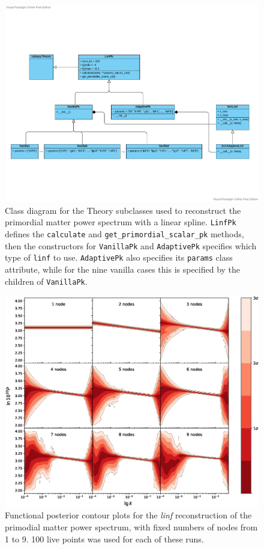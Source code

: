 \documentclass{article}
\begin{document}
\begin{figure}
  \centering
  \includegraphics[width=16cm]{Pk_linf.pdf}
  \caption{Class diagram for the Theory subclasses used to reconstruct the primordial matter power spectrum with a linear spline. \texttt{LinfPk} defines the \texttt{calculate} and \texttt{get\_primordial\_scalar\_pk} methods, then the constructors for \texttt{VanillaPk} and \texttt{AdaptivePk} specifies which type of \texttt{linf} to use. \texttt{AdaptivePk} also specifies its \texttt{params} class attribute, while for the nine vanilla cases this is specified by the children of \texttt{VanillaPk}.}
  \label{fig:PkUMLDiagram}
\end{figure}

\newpage

\begin{figure}[H]
  \centering
  \includegraphics[width=16cm]{vanilla100.eps}
  \caption{Functional posterior contour plots for the \textit{linf} reconstruction of the primodial matter power spectrum, with fixed numbers of nodes from 1 to 9. 100 live points was used for each of these runs.}
  \label{fig:Pk_vanilla_100}
\end{figure}
\end{document}
